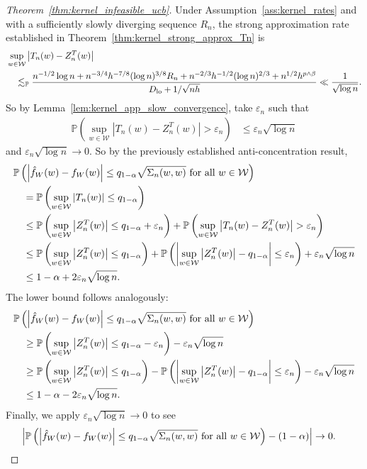 \documentclass[11pt,lof]{puthesis}
\renewcommand{\P}{\ensuremath{\mathbb{P}}}
\newcommand{\cW}{\ensuremath{\mathcal{W}}}
\newcommand{\Dl}{\ensuremath{D_{\textup{lo}}}}
\theoremstyle{break}
\theoremstyle{proof}
\newtheorem{proof}{Proof}
\begin{document}
\begin{proof}[Theorem~\ref{thm:kernel_infeasible_ucb}]
Under Assumption~\ref{ass:kernel_rates} and with a
sufficiently slowly diverging sequence $R_n$,
the strong approximation rate established in
Theorem~\ref{thm:kernel_strong_approx_Tn} is
%
\begin{align*}
&\sup_{w \in \cW} \left| T_n(w) - Z_n^T(w) \right| \\
&\quad\lesssim_\P
\frac{
n^{-1/2} \log n
+ n^{-3/4} h^{-7/8} (\log n)^{3/8} R_n
+ n^{-2/3} h^{-1/2} (\log n)^{2/3}
+ n^{1/2} h^{p \wedge \beta}}
{\Dl + 1/\sqrt{n h}}
\ll \frac{1}{\sqrt{\log n}}.
\end{align*}
%
So by Lemma~\ref{lem:kernel_app_slow_convergence}, take $\varepsilon_n$ such
that
%
\begin{align*}
\P \left(
\sup_{w \in \cW} \left| T_n(w) - Z_n^T(w) \right|
> \varepsilon_n
\right)
&\leq
\varepsilon_n \sqrt{\log n}
\end{align*}
%
and $\varepsilon_n \sqrt{\log n} \to 0$.
So by the previously established anti-concentration result,
%
\begin{align*}
&\P\left(
\left|
\hat f_W(w) - f_W(w)
\right|
\leq
q_{1-\alpha}
\sqrt{\Sigma_n(w,w)}
\textup{ for all }
w \in \cW
\right) \\
&\quad=
\P\left(
\sup_{w \in \cW}
\left| T_n(w) \right|
\leq
q_{1-\alpha}
\right) \\
&\quad\leq
\P\left(
\sup_{w \in \cW}
\left| Z_n^T(w) \right|
\leq
q_{1-\alpha}
+ \varepsilon_n
\right)
+ \P \left(
\sup_{w \in \cW} \left| T_n(w) - Z_n^T(w) \right|
> \varepsilon_n
\right) \\
&\quad\leq
\P\left(
\sup_{w \in \cW}
\left|
Z_n^T(w)
\right|
\leq
q_{1-\alpha}
\right)
+ \P\left(
\left|
\sup_{w \in \cW}
\big| Z_n^T(w) \big|
- q_{1-\alpha}
\right|
\leq \varepsilon_n
\right)
+ \varepsilon_n \sqrt{\log n} \\
&\quad\leq
1 - \alpha
+ 2 \varepsilon_n \sqrt{\log n}.
\end{align*}
%
The lower bound follows analogously:
%
\begin{align*}
&\P\left(
\left|
\hat f_W(w) - f_W(w)
\right|
\leq
q_{1-\alpha}
\sqrt{\Sigma_n(w,w)}
\textup{ for all }
w \in \cW
\right) \\
&\quad\geq
\P\left(
\sup_{w \in \cW}
\left| Z_n^T(w) \right|
\leq
q_{1-\alpha}
- \varepsilon_n
\right)
- \varepsilon_n \sqrt{\log n} \\
&\quad\geq
\P\left(
\sup_{w \in \cW}
\left|
Z_n^T(w)
\right|
\leq
q_{1-\alpha}
\right)
- \P\left(
\left|
\sup_{w \in \cW}
\big| Z_n^T(w) \big|
- q_{1-\alpha}
\right|
\leq \varepsilon_n
\right)
- \varepsilon_n \sqrt{\log n} \\
&\quad\leq
1 - \alpha
- 2 \varepsilon_n \sqrt{\log n}.
\end{align*}
%
Finally, we apply $\varepsilon_n \sqrt{\log n} \to 0$
to see
%
\begin{align*}
\left|
\P\left(
\left|
\hat f_W(w) - f_W(w)
\right|
\leq
q_{1-\alpha}
\sqrt{\Sigma_n(w,w)}
\textup{ for all }
w \in \cW
\right)
- (1 - \alpha)
\right|
&\to 0.
\end{align*}
\end{proof}
\end{document}
